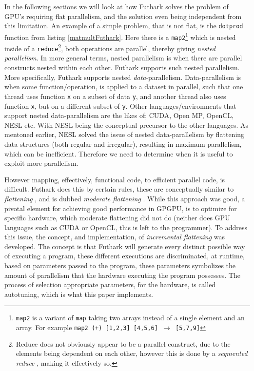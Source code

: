 In the following sections we will look at how Futhark solves the problem of
GPU's requiring flat parallelism, and the solution even being independent from
this limitation. An example of a simple problem, that is not flat, is the
\texttt{dotprod} function from listing \ref{matmultFuthark}. Here there is a \texttt{map2}\footnote{\texttt{map2} is a variant of \texttt{map} taking two arrays instead of a single element and an array. For example \texttt{map2 (+) [1,2,3] [4,5,6] $\to$ [5,7,9]}} which is nested inside of a \texttt{reduce}\footnote{Reduce does not obviously appear to be a parallel construct, due to the elements being dependent on each other, however this is done by a \textit{segmented reduce} \cite{segred}, making it effectively so.}, both operations are parallel, thereby giving \textit{nested parallelism}. In more general terms, nested parallelism is when there are parallel constructs nested within each other. Futhark supports such nested parallelism. More specifically, Futhark supports nested \textit{data}-parallelism. Data-parallelism is when some function/operation, is applied to a dataset in parallel, such that one thread uses function \texttt{x} on a subset of data \texttt{y}, and another thread also uses function \texttt{x}, but on a different subset of \texttt{y}. Other languages/environments that support nested data-parallelism are the likes of; CUDA, Open MP, OpenCL, NESL etc. With NESL being the conceptual precursor to the other languages. As mentoned earlier, NESL solved the issue of nested data-parallelism by flattening data structures (both regular and irregular), resulting in maximum parallelism, which can be inefficient. Therefore we need to determine when it is useful to exploit more parallelism. 

However mapping, effectively, functional code, to efficient parallel code, is difficult. Futhark does this by certain rules, these are conceptually similar to \textit{flattening} \cite{flat}, and is dubbed \textit{moderate flattening} \cite{futhark-nested-para}. While this approach was good, a pivotal element for achieving good performance in GPGPU, is to optimize for specific hardware, which moderate flattening did not do (neither does GPU languages such as CUDA or OpenCL, this is left to the programmer). To address this issue, the concept, and implementation, of \textit{incremental flattening} was developed. The concept is that Futhark will generate every distinct possible way of executing a program, these different executions are discriminated, at runtime, based on parameters passed to the program, these parameters symbolizes the amount of parallelism that the hardware executing the program possesses. The process of selection appropriate parameters, for the hardware, is called autotuning, which is what this paper implements.
